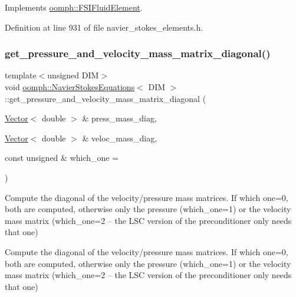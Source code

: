Implements \hyperlink{classoomph_1_1FSIFluidElement_acf10e6a716b5e0f743579dfce32e9294}{oomph\+::\+F\+S\+I\+Fluid\+Element}.



Definition at line 931 of file navier\+\_\+stokes\+\_\+elements.\+h.

\mbox{\label{classoomph_1_1NavierStokesEquations_a2d6e748dd25be78b65f927cd2b257c55}} 
\subsubsection{\texorpdfstring{get\+\_\+pressure\+\_\+and\+\_\+velocity\+\_\+mass\+\_\+matrix\+\_\+diagonal()}{get\_pressure\_and\_velocity\_mass\_matrix\_diagonal()}}
{\footnotesize\ttfamily template$<$unsigned D\+IM$>$ \\
void \hyperlink{classoomph_1_1NavierStokesEquations}{oomph\+::\+Navier\+Stokes\+Equations}$<$ D\+IM $>$\+::get\+\_\+pressure\+\_\+and\+\_\+velocity\+\_\+mass\+\_\+matrix\+\_\+diagonal (\begin{DoxyParamCaption}\item[{\hyperlink{classoomph_1_1Vector}{Vector}$<$ double $>$ \&}]{press\+\_\+mass\+\_\+diag,  }\item[{\hyperlink{classoomph_1_1Vector}{Vector}$<$ double $>$ \&}]{veloc\+\_\+mass\+\_\+diag,  }\item[{const unsigned \&}]{which\+\_\+one = {} }\end{DoxyParamCaption})\hspace{0.3cm}{\ttfamily [virtual]}}



Compute the diagonal of the velocity/pressure mass matrices. If which one=0, both are computed, otherwise only the pressure (which\+\_\+one=1) or the velocity mass matrix (which\+\_\+one=2 -- the L\+SC version of the preconditioner only needs that one) 

Compute the diagonal of the velocity/pressure mass matrices. If which one=0, both are computed, otherwise only the pressure (which\+\_\+one=1) or the velocity mass matrix (which\+\_\+one=2 -- the L\+SC version of the preconditioner only needs that one) 

